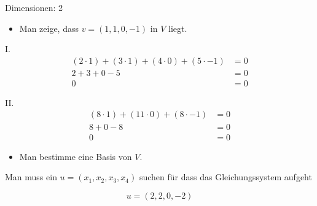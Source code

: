 Dimensionen: 2

\begin{itemize}[leftmargin=*, label={b)}]
\item Man zeige, dass $v = (1, 1, 0, -1)$ in $V$ liegt.
\end{itemize}

I.
\begin{align*}
(2 \cdot 1) + (3 \cdot 1) + (4 \cdot 0) + (5 \cdot -1) &= 0\\
2 + 3 + 0 - 5 &= 0\\
0 &= 0
\end{align*}

II.
\begin{align*}
(8 \cdot 1) + (11 \cdot 0) + (8 \cdot -1) &= 0\\
8 + 0 - 8 &= 0\\
0 &= 0
\end{align*}

\begin{itemize}[leftmargin=*, label={c)}]
\item Man bestimme eine Basis von $V$.
\end{itemize}

Man muss ein $u = (x_1, x_2, x_3, x_4)$ suchen für dass das Gleichungssystem aufgeht

$$
u = (2, 2, 0, -2)
$$

\newpage